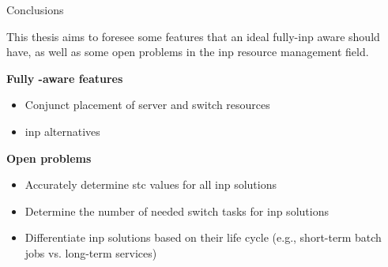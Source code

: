 \begin{frame}{Conclusions}

    \small{This thesis aims to foresee some features that an ideal fully-\gls*{inp} aware  should have, as well as some open problems in the \gls*{inp} resource management field.}

    \vspace{3mm}

    \textbf{Fully \texorpdfstring{}{INP}-aware \texorpdfstring{}{RM} features}\\
    \begin{itemize}
        \item Conjunct placement of server and switch resources
        \item \gls*{inp} alternatives 
    \end{itemize}

    \vspace{1mm}

    \textbf{Open problems}\\
    \begin{itemize}
        \item Accurately determine \gls*{stc} values for all \gls*{inp} solutions
        \item Determine the number of needed switch tasks for \gls*{inp} solutions
        \item Differentiate \gls*{inp} solutions based on their life cycle (e.g., short-term batch jobs vs. long-term services)
    \end{itemize}

\end{frame}
